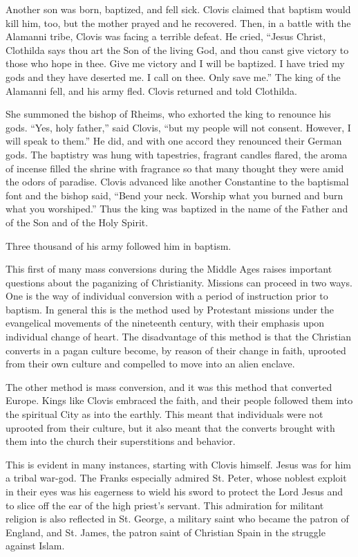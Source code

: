 Another son was born, baptized, and fell sick. Clovis claimed that baptism would kill him, too, but
the mother prayed and he recovered. Then, in a battle with the Alamanni tribe, Clovis was facing a
terrible defeat. He cried, “Jesus Christ, Clothilda says thou art the Son of the living God, and
thou canst give victory to those who hope in thee. Give me victory and I will be baptized. I have
tried my gods and they have deserted me. I call on thee. Only save me.” The king of the Alamanni
fell, and his army fled. Clovis returned and told Clothilda.

She summoned the bishop of Rheims, who exhorted the king to renounce his gods. “Yes, holy father,”
said Clovis, “but my people will not consent. However, I will speak to them.” He did, and with one
accord they renounced their German gods. The baptistry was hung with tapestries, fragrant candles
flared, the aroma of incense filled the shrine with fragrance so that many thought they were amid
the odors of paradise. Clovis advanced like another Constantine to the baptismal font and the bishop
said, “Bend your neck. Worship what you burned and burn what you worshiped.” Thus the king was
baptized in the name of the Father and of the Son and of the Holy Spirit.

Three thousand of his army followed him in baptism.

This first of many mass conversions during the Middle Ages raises important questions about the
paganizing of Christianity. Missions can proceed in two ways. One is the way of individual
conversion with a period of instruction prior to baptism. In general this is the method used by
Protestant missions under the evangelical movements of the nineteenth century, with their emphasis
upon individual change of heart. The disadvantage of this method is that the Christian converts in a
pagan culture become, by reason of their change in faith, uprooted from their own culture and
compelled to move into an alien enclave.

The other method is mass conversion, and it was this method that converted Europe. Kings like Clovis
embraced the faith, and their people followed them into the spiritual City as into the earthly. This
meant that individuals were not uprooted from their culture, but it also meant that the converts
brought with them into the church their superstitions and behavior.

This is evident in many instances, starting with Clovis himself. Jesus was for him a tribal war-god.
The Franks especially admired St. Peter, whose noblest exploit in their eyes was his eagerness to
wield his sword to protect the Lord Jesus and to slice off the ear of the high priest’s servant.
This admiration for militant religion is also reflected in St. George, a military saint who became
the patron of England, and St. James, the patron saint of Christian Spain in the struggle against
Islam.

